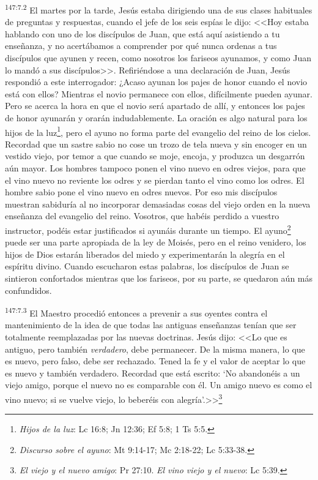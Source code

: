 \par 
\textsuperscript{147:7.2} El martes por la tarde, Jesús estaba dirigiendo una de sus clases habituales de preguntas y respuestas, cuando el jefe de los seis espías le dijo: <<Hoy estaba hablando con uno de los discípulos de Juan, que está aquí asistiendo a tu enseñanza, y no acertábamos a comprender por qué nunca ordenas a tus discípulos que ayunen y recen, como nosotros los fariseos ayunamos, y como Juan lo mandó a sus discípulos>>. Refiriéndose a una declaración de Juan, Jesús respondió a este interrogador: \guillemotleft¿Acaso ayunan los pajes de honor cuando el novio está con ellos? Mientras el novio permanece con ellos, difícilmente pueden ayunar. Pero se acerca la hora en que el novio será apartado de allí, y entonces los pajes de honor ayunarán y orarán indudablemente. La oración es algo natural para los hijos de la luz\footnote{\textit{Hijos de la luz}: Lc 16:8; Jn 12:36; Ef 5:8; 1 Ts 5:5.}, pero el ayuno no forma parte del evangelio del reino de los cielos. Recordad que un sastre sabio no cose un trozo de tela nueva y sin encoger en un vestido viejo, por temor a que cuando se moje, encoja, y produzca un desgarrón aún mayor. Los hombres tampoco ponen el vino nuevo en odres viejos, para que el vino nuevo no reviente los odres y se pierdan tanto el vino como los odres. El hombre sabio pone el vino nuevo en odres nuevos. Por eso mis discípulos muestran sabiduría al no incorporar demasiadas cosas del viejo orden en la nueva enseñanza del evangelio del reino. Vosotros, que habéis perdido a vuestro instructor, podéis estar justificados si ayunáis durante un tiempo. El ayuno\footnote{\textit{Discurso sobre el ayuno}: Mt 9:14-17; Mc 2:18-22; Lc 5:33-38.} puede ser una parte apropiada de la ley de Moisés, pero en el reino venidero, los hijos de Dios estarán liberados del miedo y experimentarán la alegría en el espíritu divino\guillemotright. Cuando escucharon estas palabras, los discípulos de Juan se sintieron confortados mientras que los fariseos, por su parte, se quedaron aún más confundidos.

\par 
\textsuperscript{147:7.3} El Maestro procedió entonces a prevenir a sus oyentes contra el mantenimiento de la idea de que todas las antiguas enseñanzas tenían que ser totalmente reemplazadas por las nuevas doctrinas. Jesús dijo: <<Lo que es antiguo, pero también \textit{verdadero}, debe permanecer. De la misma manera, lo que es nuevo, pero falso, debe ser rechazado. Tened la fe y el valor de aceptar lo que es nuevo y también verdadero. Recordad que está escrito: `No abandonéis a un viejo amigo, porque el nuevo no es comparable con él. Un amigo nuevo es como el vino nuevo; si se vuelve viejo, lo beberéis con alegría'.>>\footnote{\textit{El viejo y el nuevo amigo}: Pr 27:10. \textit{El vino viejo y el nuevo}: Lc 5:39.}

